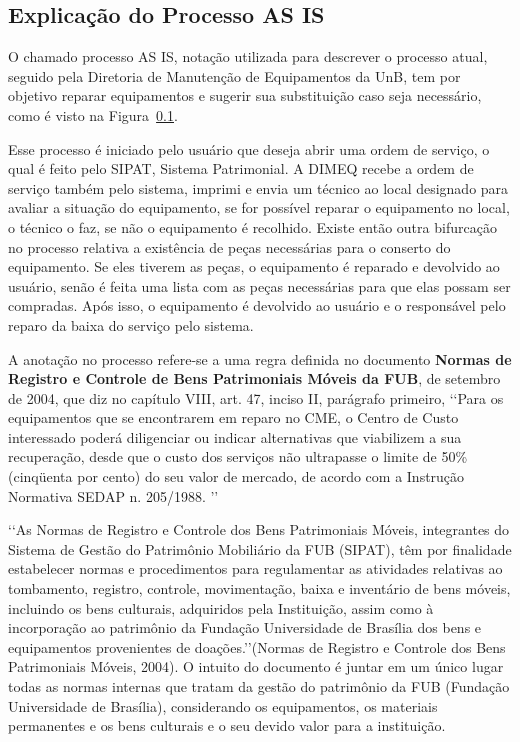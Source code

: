 
\subsection{Explicação do Processo AS IS}
\label{processo-as-is}

O chamado processo AS IS, notação utilizada para descrever o processo atual, seguido pela Diretoria de Manutenção de Equipamentos da UnB, tem por objetivo reparar equipamentos e sugerir sua substituição caso seja necessário, como é visto na Figura~\ref{processo-as-is}.

Esse processo é iniciado pelo usuário que deseja abrir uma ordem de serviço, o qual é feito pelo SIPAT, Sistema Patrimonial. A DIMEQ recebe a ordem de serviço também pelo sistema, imprimi e envia um técnico ao local designado para avaliar a situação do equipamento, se for possível reparar o equipamento no local, o técnico o faz, se não o equipamento é recolhido. Existe então outra bifurcação no processo relativa a existência de peças necessárias para o conserto do equipamento. Se eles tiverem as peças, o equipamento é reparado e devolvido ao usuário, senão é feita uma lista com as peças necessárias para que elas possam ser compradas. Após isso, o equipamento é devolvido ao usuário e o responsável pelo reparo da baixa do serviço pelo sistema.

A anotação no processo refere-se a uma regra definida no documento \textbf{Normas de Registro e Controle de Bens Patrimoniais Móveis da FUB}, de setembro de 2004, que diz no capítulo VIII,  art. 47, inciso II, parágrafo primeiro, \lq\lq Para os equipamentos que se encontrarem em reparo no CME, o Centro de Custo interessado poderá diligenciar ou indicar alternativas que viabilizem a sua recuperação, desde que o custo dos serviços não ultrapasse o limite de 50\% (cinqüenta por cento) do seu valor de mercado, de acordo com a Instrução Normativa SEDAP n. 205/1988. \rq\rq

\lq\lq As Normas de Registro e Controle dos Bens Patrimoniais Móveis, integrantes do Sistema de Gestão do Patrimônio Mobiliário da FUB (SIPAT), têm por finalidade estabelecer normas e procedimentos para regulamentar as atividades relativas ao tombamento, registro, controle, movimentação, baixa e inventário de bens móveis, incluindo os bens culturais, adquiridos pela Instituição, assim como à incorporação ao patrimônio da Fundação Universidade de Brasília dos bens e equipamentos provenientes de doações.\rq\rq (Normas de Registro e Controle dos Bens Patrimoniais Móveis, 2004). O intuito do documento é juntar em um único lugar todas as normas internas que tratam da gestão do patrimônio da FUB (Fundação Universidade de Brasília), considerando os equipamentos, os materiais permanentes e os bens culturais e o seu devido valor para a instituição.

